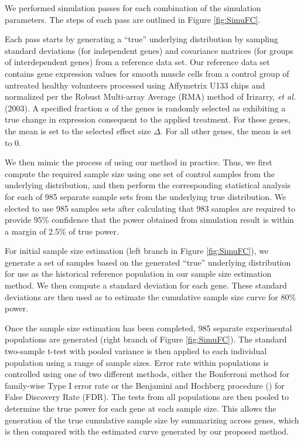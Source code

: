 \documentclass{bioinfo}
\begin{document}
We performed simulation passes for each combination of the
simulation parameters.  The steps of each pass are outlined in
Figure \ref{fig:SimuFC}.

Each pass starts by generating a ``true'' underlying distribution
by sampling standard deviations (for independent genes) and
covariance matrices (for groups of interdependent genes) from a
reference data set.  Our reference data set contains gene
expression values for smooth muscle cells from a control group of
untreated healthy volunteers processed using Affymetrix U133 chips
and normalized per the Robust Multi-array Average (RMA) method of
Irizarry, \textit{et al.} (2003).  A specified fraction $a$ of the
genes is randomly selected as exhibiting a true change in
expression consequent to the applied treatment. For these genes,
the mean is set to the selected effect size $\Delta$.  For all
other genes, the mean is set to $0$.

We then mimic the process of using our method in practice. Thus, we
first compute the required sample size using one set of control
samples from the underlying distribution, and then perform the
corresponding statistical analysis for each of 985 separate sample
sets from the underlying true distribution.  We elected to use 985
samples sets after calculating that 983 samples are required to
provide 95\% confidence that the power obtained from simulation
result is within a margin of 2.5\% of true power.

For initial sample size estimation (left branch in Figure
\ref{fig:SimuFC}), we generate a set of samples based on the
generated ``true'' underlying distribution for use as the historical
reference population in our sample size estimation method.  We then
compute a standard deviation for each gene. These standard
deviations are then used as to estimate the cumulative sample size
curve for 80\% power.

Once the sample size estimation has been completed, 985 separate
experimental populations are generated (right branch of Figure
\ref{fig:SimuFC}).  The standard two-sample t-test with pooled
variance is then applied to each individual population using a range
of sample sizes.  Error rate within populations is controlled using
one of two different methods, either the Bonferroni method for
family-wise Type I error rate or the Benjamini and Hochberg
procedure (\citealp{Benjamini95}) for False Discovery Rate (FDR).
The tests from all populations are then pooled to determine the true
power for each gene at each sample size. This allows the generation
of the true cumulative sample size by summarizing across genes,
which is then compared with the estimated curve generated by our
proposed method.
\end{document}
